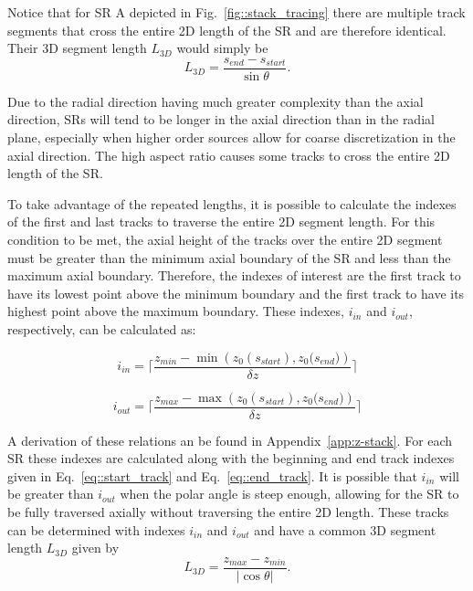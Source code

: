 Notice that for \ac{SR} A depicted in Fig.~\ref{fig::stack_tracing} there are multiple track segments that cross the entire 2D length of the \ac{SR} and are therefore identical. Their 3D segment length $L_{3D}$ would simply be
\begin{equation}
L_{3D} = \frac{s_{\textit{end}} - s_{\textit{start}}}{\sin{\theta}}.
\end{equation}

Due to the radial direction having much greater complexity than the axial direction, \ac{SR}s will tend to be longer in the axial direction than in the radial plane, especially when higher order sources allow for coarse discretization in the axial direction. The high aspect ratio causes some tracks to cross the entire 2D length of the \ac{SR}.

To take advantage of the repeated lengths, it is possible to calculate the indexes of the first and last tracks to traverse the entire 2D segment length. For this condition to be met, the axial height of the tracks over the entire 2D segment must be greater than the minimum axial boundary of the \ac{SR} and less than the maximum axial boundary. Therefore, the indexes of interest are the first track to have its lowest point above the minimum boundary and the first track to have its highest point above the maximum boundary. These indexes, $i_{\textit{in}}$ and $i_{\textit{out}}$, respectively, can be calculated as:

\begin{equation}
i_{\textit{in}} = \Bigg\lceil\frac{z_{\textit{min}} - \min\left({z_0(s_{\textit{start}}), z_0(s_{\textit{end}}})\right) }{\delta z}\Bigg\rceil
\end{equation}

\begin{equation}
i_{\textit{out}} = \Bigg\lceil\frac{z_{\textit{max}} - \max\left({z_0(s_{\textit{start}}), z_0(s_{\textit{end}}})\right) }{\delta z}\Bigg\rceil
\end{equation}

A derivation of these relations an be found in Appendix~\ref{app:z-stack}. For each \ac{SR} these indexes are calculated along with the beginning and end track indexes given in Eq.~\ref{eq::start_track} and Eq.~\ref{eq::end_track}. It is possible that $i_{\textit{in}}$ will be greater than $i_{\textit{out}}$ when the polar angle is steep enough, allowing for the \ac{SR} to be fully traversed axially without traversing the entire 2D length. These tracks can be determined with indexes $i_{\textit{in}}$ and $i_{\textit{out}}$ and have a common 3D segment length $L_{3D}$ given by
\begin{equation}
L_{3D} = \frac{z_{\textit{max}} - z_{\textit{min}}}{\left| \cos{\theta}\right|}.
\end{equation}

